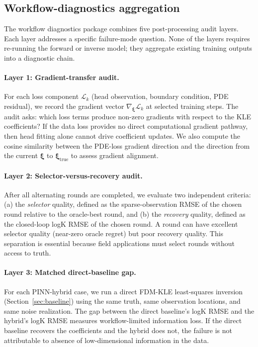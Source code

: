 \documentclass[pdflatex,sn-mathphys,Numbered,iicol]{sn-jnl}
\newcommand{\bxi}{\boldsymbol{\xi}}
\newcommand{\bxitrue}{\boldsymbol{\xi}_{\mathrm{true}}}
\begin{document}
\subsection{Workflow-diagnostics aggregation}
\label{sec:diag-aggregate}

The workflow diagnostics package combines five post-processing audit layers.
Each layer addresses a specific failure-mode question. None of the layers
requires re-running the forward or inverse model; they aggregate existing
training outputs into a diagnostic chain.

\paragraph{Layer 1: Gradient-transfer audit.}
For each loss component $\mathcal{L}_k$ (head observation, boundary condition,
PDE residual), we record the gradient vector
$\nabla_{\bxi} \mathcal{L}_k$ at selected training steps. The audit asks:
which loss terms produce non-zero gradients with respect to the KLE
coefficients? If the data loss provides no direct computational gradient
pathway, then head fitting alone cannot drive coefficient updates. We also compute the cosine similarity
between the PDE-loss gradient direction and the direction from the current
$\bxi$ to $\bxitrue$ to assess gradient alignment.

\paragraph{Layer 2: Selector-versus-recovery audit.}
After all alternating rounds are completed, we evaluate two independent
criteria: (a) the \emph{selector} quality, defined as the sparse-observation
RMSE of the chosen round relative to the oracle-best round, and (b) the
\emph{recovery} quality, defined as the closed-loop logK RMSE of the chosen
round. A round can have excellent selector quality (near-zero oracle regret)
but poor recovery quality. This separation is essential because field
applications must select rounds without access to truth.

\paragraph{Layer 3: Matched direct-baseline gap.}
For each PINN-hybrid case, we run a direct FDM-KLE least-squares inversion
(Section~\ref{sec:baseline}) using the same truth, same observation
locations, and same noise realization. The gap between the direct baseline's
logK RMSE and the hybrid's logK RMSE measures workflow-limited information
loss. If the direct baseline recovers the coefficients and the hybrid does
not, the failure is not attributable to absence of low-dimensional
information in the data.
\end{document}
